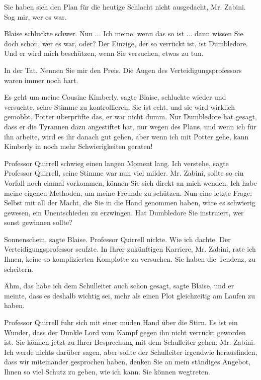 \glqq{}Sie haben sich den Plan für die heutige Schlacht nicht ausgedacht, Mr.
Zabini. Sag mir, wer es war.\grqq{}

Blaise schluckte schwer. \glqq{}Nun ... Ich meine, wenn das so ist ... dann wissen
Sie doch schon, wer es war, oder? Der Einzige, der so verrückt ist, ist
Dumbledore. Und er wird mich beschützen, wenn Sie versuchen, etwas zu tun.\grqq{}

\glqq{}In der Tat. Nennen Sie mir den Preis.\grqq{} Die Augen des
Verteidigungsprofessors waren immer noch hart.

\glqq{}Es geht um meine Cousine Kimberly\grqq{}, sagte Blaise, schluckte wieder
und versuchte, seine Stimme zu kontrollieren. \glqq{}Sie ist echt, und sie wird
wirklich gemobbt\grqq{}, Potter überprüfte das, er war nicht dumm. Nur
Dumbledore hat gesagt, dass er die Tyrannen dazu angestiftet hat, nur wegen des
Plans, und wenn ich für ihn arbeite, wird es ihr danach gut gehen, aber wenn ich
mit Potter gehe, kann Kimberly in noch mehr Schwierigkeiten geraten!\grqq{}

Professor Quirrell schwieg einen langen Moment lang. \glqq{}Ich verstehe\grqq{},
sagte Professor Quirrell, seine Stimme war nun viel milder. \glqq{}Mr. Zabini,
sollte so ein Vorfall noch einmal vorkommen, können Sie sich direkt an mich
wenden. Ich habe meine eigenen Methoden, um meine Freunde zu schützen. Nun eine
letzte Frage: Selbst mit all der Macht, die Sie in die Hand genommen haben, wäre
es schwierig gewesen, ein Unentschieden zu erzwingen. Hat Dumbledore Sie
instruiert, wer sonst gewinnen sollte?\grqq{}

\glqq{}Sonnenschein\grqq{}, sagte Blaise. Professor Quirrell nickte. \glqq{}Wie
ich dachte.\grqq{} Der Verteidigungsprofessor seufzte. \glqq{}In Ihrer zukünftigen
Karriere, Mr. Zabini, rate ich Ihnen, keine so komplizierten Komplotte zu
versuchen. Sie haben die Tendenz, zu scheitern.\grqq{}

\glqq{}Ähm, das habe ich dem Schulleiter auch schon gesagt\grqq{}, sagte Blaise,
\glqq{}und er meinte, dass es deshalb wichtig sei, mehr als einen Plot
gleichzeitig am Laufen zu haben.\grqq{}

Professor Quirrell fuhr sich mit einer müden Hand über die Stirn. \glqq{}Es ist
ein Wunder, dass der Dunkle Lord vom Kampf gegen ihn nicht verrückt geworden
ist. Sie können jetzt zu Ihrer Besprechung mit dem Schulleiter gehen, Mr.
Zabini. Ich werde nichts darüber sagen, aber sollte der Schulleiter irgendwie
herausfinden, dass wir miteinander gesprochen haben, denken Sie an mein
ständiges Angebot, Ihnen so viel Schutz zu geben, wie ich kann. Sie können
wegtreten.\grqq{}

